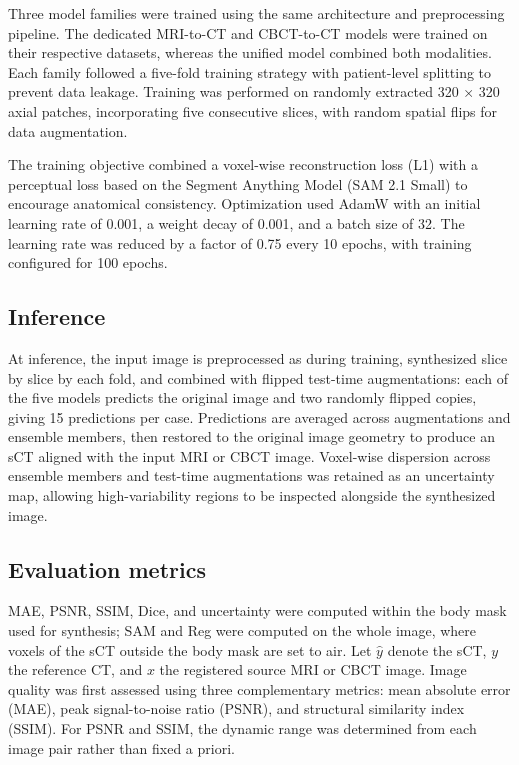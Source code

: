 \documentclass{article}
\begin{document}
Three model families were trained using the same architecture and preprocessing pipeline. The dedicated MRI-to-CT and CBCT-to-CT models were trained on their respective datasets, whereas the unified model combined both modalities. Each family followed a five-fold training strategy with patient-level splitting to prevent data leakage. Training was performed on randomly extracted 320 × 320 axial patches, incorporating five consecutive slices, with random spatial flips for data augmentation.

The training objective combined a voxel-wise reconstruction loss (L1) with a perceptual loss based on the Segment Anything Model \cite{ravi2025sam2} (SAM 2.1 Small) to encourage anatomical consistency. Optimization used AdamW with an initial learning rate of 0.001, a weight decay of 0.001, and a batch size of 32. The learning rate was reduced by a factor of 0.75 every 10 epochs, with training configured for 100 epochs.

\subsection{Inference}

At inference, the input image is preprocessed as during training, synthesized slice by slice by each fold, and combined with flipped test-time augmentations: each of the five models predicts the original image and two randomly flipped copies, giving 15 predictions per case. Predictions are averaged across augmentations and ensemble members, then restored to the original image geometry to produce an sCT aligned with the input MRI or CBCT image. Voxel-wise dispersion across ensemble members and test-time augmentations was retained as an uncertainty map, allowing high-variability regions to be inspected alongside the synthesized image.

\subsection{Evaluation metrics}

MAE, PSNR, SSIM, Dice, and uncertainty were computed within the body mask used for synthesis; SAM and Reg were computed on the whole image, where voxels of the sCT outside the body mask are set to air. Let $\hat{y}$ denote the sCT, $y$ the reference CT, and $x$ the registered source MRI or CBCT image. Image quality was first assessed using three complementary metrics: mean absolute error (MAE), peak signal-to-noise ratio (PSNR), and structural similarity index (SSIM). For PSNR and SSIM, the dynamic range was determined from each image pair rather than fixed a priori.
\end{document}
